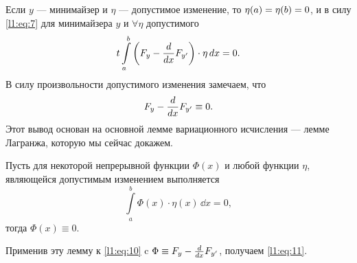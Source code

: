 Если $y$ --- минимайзер и $\eta$ --- допустимое изменение, то $\eta(a)=\eta(b)\?=0$, и в силу \eqref{l1:eq:7} для минимайзера $y$ и $\forall\eta$ допустимого
\begin{equation}
	\label{l1:eq:10}
	 t\int\limits_a^b\left(F_y-\frac{d}{dx}F_{y'}\right)\cdot\eta\,d{x}=0.
\end{equation}
В силу произвольности допустимого изменения замечаем, что 
\begin{equation}
	\label{l1:eq:11}
	 F_y-\frac{d}{dx}F_{y'}\equiv0.
\end{equation}
Этот вывод основан на основной лемме вариационного исчисления --- лемме Лагранжа, которую мы сейчас докажем.
\begin{Lemm}[Лагранжа]
	Пусть для некоторой непрерывной функции $\Phi(x)$ и любой функции $\eta$, являющейся допустимым изменением выполняется
	\begin{equation}
		\label{l1:eq:12}
		\int\limits_a^b \Phi(x)\cdot\eta(x)\,\dd{x}=0,
	\end{equation}
	тогда $\Phi(x)\equiv0$.
\end{Lemm}
\noindent Применив эту лемму к \eqref{l1:eq:10} c $\Phi\equiv F_y-\frac{d}{dx}F_{y'}$, получаем \eqref{l1:eq:11}.
